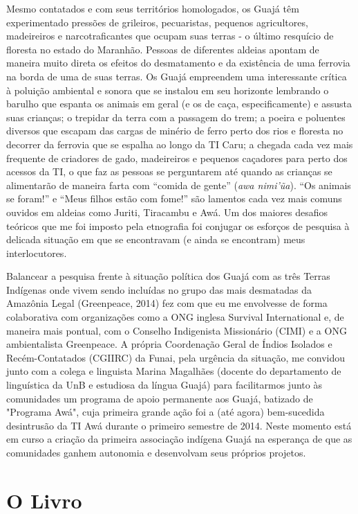 Mesmo contatados e com seus territórios homologados, os Guajá têm
experimentado pressões de grileiros, pecuaristas, pequenos agricultores,
madeireiros e narcotraficantes que ocupam suas terras - o último
resquício de floresta no estado do Maranhão. Pessoas de diferentes
aldeias apontam de maneira muito direta os efeitos do desmatamento e da
existência de uma ferrovia na borda de uma de suas terras. Os Guajá
empreendem uma interessante crítica à poluição ambiental e sonora que se
instalou em seu horizonte lembrando o barulho que espanta os animais em
geral (e os de caça, especificamente) e assusta suas crianças; o
trepidar da terra com a passagem do trem; a poeira e poluentes diversos
que escapam das cargas de minério de ferro perto dos rios e floresta no
decorrer da ferrovia que se espalha ao longo da TI Caru; a chegada cada
vez mais frequente de criadores de gado, madeireiros e pequenos
caçadores para perto dos acessos da TI, o que faz as pessoas se
perguntarem até quando as crianças se alimentarão de maneira farta com
``comida de gente'' (\emph{awa nimi'ũa}). ``Os animais se foram!'' e
``Meus filhos estão com fome!'' são lamentos cada vez mais comuns
ouvidos em aldeias como Juriti, Tiracambu e Awá. Um dos maiores desafios
teóricos que me foi imposto pela etnografia foi conjugar os esforços de
pesquisa à delicada situação em que se encontravam (e ainda se
encontram) meus interlocutores.

Balancear a pesquisa frente à situação política dos Guajá com as três
Terras Indígenas onde vivem sendo incluídas no grupo das mais desmatadas
da Amazônia Legal (Greenpeace, 2014) fez com que eu me envolvesse de
forma colaborativa com organizações como a ONG inglesa Survival
International e, de maneira mais pontual, com o Conselho Indigenista
Missionário (CIMI) e a ONG ambientalista Greenpeace. A própria
Coordenação Geral de Índios Isolados e Recém-Contatados (CGIIRC) da
Funai, pela urgência da situação, me convidou junto com a colega e
linguista Marina Magalhães (docente do departamento de linguística da
UnB e estudiosa da língua Guajá) para facilitarmos junto às comunidades
um programa de apoio permanente aos Guajá, batizado de "Programa Awá",
cuja primeira grande ação foi a (até agora) bem-sucedida desintrusão da
TI Awá durante o primeiro semestre de 2014. Neste momento está em curso
a criação da primeira associação indígena Guajá na esperança de que as
comunidades ganhem autonomia e desenvolvam seus próprios projetos.

\section{O Livro}

